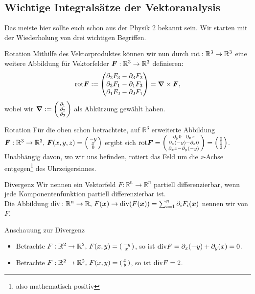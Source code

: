 \subsection{Wichtige Integralsätze der Vektoranalysis}
Das meiste hier sollte euch schon aus der Physik 2 bekannt sein. Wir starten mit der Wiederholung von drei wichtigen Begriffen.
\begin{Def}
{Rotation}
Mithilfe des Vektorproduktes können wir nun durch $\text{rot}:\mathbb{R}^3\to\mathbb{R}^3$ eine weitere Abbildung für Vektorfelder ${{\text{\boldmath${F}$}}}:\mathbb{R}^3\to\mathbb{R}^3$ definieren:
\begin{equation}
    \text{rot} {{\text{\boldmath${F}$}}}:=\begin{pmatrix}\partial_2 F_3-\partial_3 F_2\\\partial_3 F_1-\partial_1 F_3\\\partial_1 F_2-\partial_2 F_1\end{pmatrix}={{\text{\boldmath${\nabla}$}}}\times {{\text{\boldmath${F}$}}},
\end{equation}
wobei wir ${{\text{\boldmath${\nabla}$}}}:=\left(\begin{smallmatrix}\partial_1\\\partial_2\\\partial_3\end{smallmatrix}\right)$ als Abkürzung gewählt haben.
\end{Def}
\begin{Beispiel}
{Rotation}
Für die oben schon betrachtete, auf $\mathbb{R}^3$ erweiterte Abbildung ${{\text{\boldmath${F}$}}}:\mathbb{R}^3\to\mathbb{R}^3,\,{{\text{\boldmath${F}$}}}(x,y,z)=\left(\begin{smallmatrix}-y\\x\\0\end{smallmatrix}\right)$ ergibt sich $\text{rot} {{\text{\boldmath${F}$}}}=\left(\begin{smallmatrix}\partial_y 0-\partial_zx\\\partial_z (-y)-\partial_x 0\\\partial_x x-\partial_y (-y)\end{smallmatrix}\right)=\left(\begin{smallmatrix}0\\0\\2\end{smallmatrix}\right)$.\\
Unabhängig davon, wo wir uns befinden, rotiert das Feld um die $z$-Achse entgegen\footnote{also mathematisch positiv} des Uhrzeigersinnes.
\end{Beispiel}
\begin{Def}
{Divergenz}
Wir nennen ein Vektorfeld $F:\mathbb{R}^n\to\mathbb{R}^n$ partiell differenzierbar, wenn jede Komponentenfunktion partiell differenzierbar ist.\\
Die Abbildung $\text{div}:\mathbb{R}^n\to\mathbb{R},\,F({{\text{\boldmath${x}$}}})\to\text{div}(F({{\text{\boldmath${x}$}}}))=\sum_{i=1}^n\partial_iF_i({{\text{\boldmath${x}$}}})$ nennen wir  von $F$.
\end{Def}
\begin{Beispiel}
{Anschauung zur Divergenz}
\begin{itemize}
    \item Betrachte $F:\mathbb{R}^2\to\mathbb{R}^2,\,F(x,y)=\left(\begin{smallmatrix}-y\\x\end{smallmatrix}\right)$, so ist $\text{div} F=\partial_x(-y)+\partial_y(x)=0$.
    \item Betrachte $F:\mathbb{R}^2\to\mathbb{R}^2,\,F(x,y)=\left(\begin{smallmatrix}x\\y\end{smallmatrix}\right)$, so ist $\text{div} F=2$.
\end{itemize}
\end{Beispiel}
